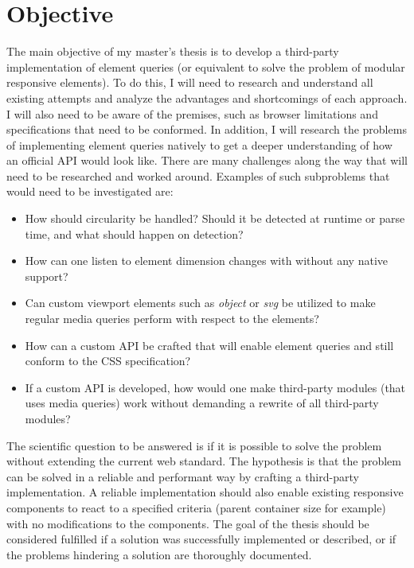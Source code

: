 \documentclass[oneside,a4paper,11pt]{kth-mag}
\begin{document}
\section*{Objective}
The main objective of my master's thesis is to develop a third-party implementation of element queries (or equivalent to solve the problem of modular responsive elements). To do this, I will need to research and understand all existing attempts and analyze the advantages and shortcomings of each approach. I will also need to be aware of the premises, such as browser limitations and specifications that need to be conformed. In addition, I will research the problems of implementing element queries natively to get a deeper understanding of how an official API would look like. There are many challenges along the way that will need to be researched and worked around. Examples of such subproblems that would need to be investigated are:
\begin{itemize}
\item How should circularity be handled? Should it be detected at runtime or parse time, and what should happen on detection?
\item How can one listen to element dimension changes with without any native support?
\item Can custom viewport elements such as \emph{object} or \emph{svg} be utilized to make regular media queries perform with respect to the elements?
\item How can a custom API be crafted that will enable element queries and still conform to the CSS specification?
\item If a custom API is developed, how would one make third-party modules (that uses media queries) work without demanding a rewrite of all third-party modules?
\end{itemize}
The scientific question to be answered is if it is possible to solve the problem  without extending the current web standard. The hypothesis is that the problem can be solved in a reliable and performant way by crafting a third-party implementation. A reliable implementation should also enable existing responsive components to react to a specified criteria (parent container size for example) with no modifications to the components. The goal of the thesis should be considered fulfilled if a solution was successfully implemented or described, or if the problems hindering a solution are thoroughly documented.
\end{document}

